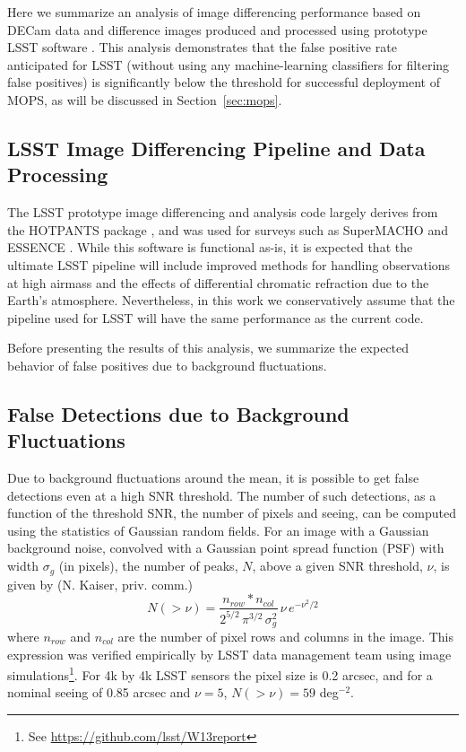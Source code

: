 Here we summarize an analysis of image differencing performance based on DECam
data and difference images produced and processed using prototype LSST
software \citep{DMTN-006}. This analysis demonstrates that the false
positive rate anticipated for LSST (without using any machine-learning classifiers for
filtering false positives) is significantly below the threshold for
successful deployment of MOPS, as will be discussed in Section~\ref{sec:mops}.



\subsection{LSST Image Differencing Pipeline and Data Processing}

The LSST prototype image differencing and analysis code largely derives from the
HOTPANTS package \citep{becker15}, and was used for surveys such as SuperMACHO
\citep{becker05} and ESSENCE \citep{miknaitis07}. While this software is
functional as-is, it is expected that the ultimate LSST pipeline will include
improved methods for handling observations at high airmass and the effects of
differential chromatic refraction due to the Earth's atmosphere. Nevertheless, in
this work we conservatively assume that the pipeline used for LSST will have the
same performance as the current code.

Before presenting the results of this analysis, we summarize the expected behavior
of false positives due to background fluctuations.


\subsection{False Detections due to Background Fluctuations \label{sec:kaiser}}

Due to background fluctuations around the mean, it is possible to get false
detections even at a high SNR threshold. The number of
such detections, as a function of the threshold SNR, the number of pixels and
seeing, can be computed using the statistics of Gaussian random fields.
For an image with a Gaussian background noise, convolved with a Gaussian point
spread function (PSF) with width $\sigma_g$ (in pixels), the number of peaks, $N$, above a
given SNR threshold, $\nu$, is given by (N. Kaiser, priv. comm.)
\begin{equation}
N(>\nu)  = \frac{n_{row}*n_{col}}{2^{5/2} \, \pi^{3/2} \, \sigma_g^2} \, \nu \, e^{-\nu^2 /2}
\label{eq-theory}
\end{equation}
where $n_{row}$ and $n_{col}$ are the number of pixel rows and columns in the image.
This expression was verified empirically by LSST data management team using
image simulations\footnote{See \url{https://github.com/lsst/W13report}}.
For 4k by 4k LSST sensors the pixel size is 0.2 arcsec, and for a nominal seeing
of 0.85 arcsec and $\nu=5$, $N(>\nu) = 59$ deg$^{-2}$.

